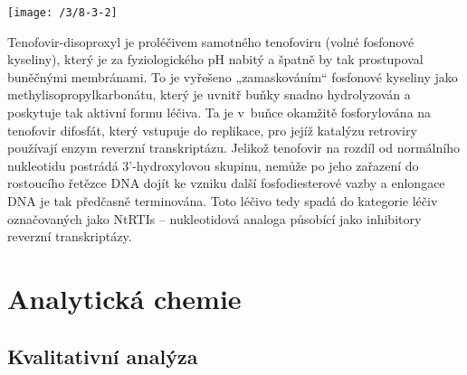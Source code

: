 \documentclass{book}
\begin{document}
\begin{center}
\texttt{[image: /3/8-3-2]}
\end{center}

Tenofovir-disoproxyl je proléčivem samotného tenofoviru (volné
fosfonové kyseliny), který je za fyziologického pH nabitý a špatně
by tak prostupoval buněčnými membránami. To je vyřešeno „zamaskováním“
fosfonové kyseliny jako methyl\-isopropyl\-karbonátu, který je uvnitř
buňky snadno hydrolyzován a poskytuje tak aktivní formu léčiva. Ta
je v~buňce okamžitě fosforylována na tenofovir difosfát, který vstupuje
do replikace, pro jejíž katalýzu retroviry používají enzym reverzní
transkriptázu. Jelikož tenofovir na rozdíl od normálního nukleotidu
postrádá 3'-hydroxylovou skupinu, nemůže po jeho zařazení do rostoucího
řetězce DNA dojít ke vzniku další fosfodiesterové vazby a enlongace
DNA je tak předčasně terminována. Toto léčivo tedy spadá do kategorie
léčiv označovaných jako NtRTIs -- nukleotidová analoga působící
jako inhibitory reverzní transkriptázy.

\chapter{Analytická chemie}

\section{Kvalitativní analýza}
\end{document}
